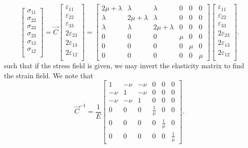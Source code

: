 \begin{equation*}
	\begin{bmatrix}
		\sigma_{11}\\
		\sigma_{22}\\
		\sigma_{33}\\
		\sigma_{23}\\
		\sigma_{13}\\
		\sigma_{12}\\
	\end{bmatrix} = \vec{C}
	\begin{bmatrix}
		\varepsilon_{11}\\
		\varepsilon_{22}\\
		\varepsilon_{33}\\
		2\varepsilon_{23}\\
		2\varepsilon_{13}\\
		2\varepsilon_{12}\\
	\end{bmatrix} = \begin{bmatrix}
		2\mu+\lambda & \lambda & \lambda & 0 & 0 & 0\\
		\lambda & 2\mu+\lambda & \lambda & 0 & 0 & 0\\
		\lambda & \lambda & 2\mu+\lambda & 0 & 0 & 0\\
		0 & 0 & 0 & \mu & 0 & 0\\
		0 & 0 & 0 & 0 & \mu & 0\\
		0 & 0 & 0 & 0 & 0 & \mu
	\end{bmatrix}
	\begin{bmatrix}
		\varepsilon_{11}\\
		\varepsilon_{22}\\
		\varepsilon_{33}\\
		2\varepsilon_{23}\\
		2\varepsilon_{13}\\
		2\varepsilon_{12}\\
	\end{bmatrix}.
\end{equation*}
such that if the stress field is given, we may invert the elasticity matrix to find the strain field. We note that
\begin{equation*}
	\vec{C}^{-1} = \frac{1}{E}\begin{bmatrix}
		1 & -\nu & -\nu & 0 & 0 & 0\\
		-\nu & 1 & -\nu & 0 & 0 & 0\\
		-\nu & -\nu & 1 & 0 & 0 & 0\\
		0 & 0 & 0 & \frac{1}{\mu} & 0 & 0\\
		0 & 0 & 0 & 0 & \frac{1}{\mu} & 0\\
		0 & 0 & 0 & 0 & 0 & \frac{1}{\mu}
	\end{bmatrix}.
\end{equation*}
